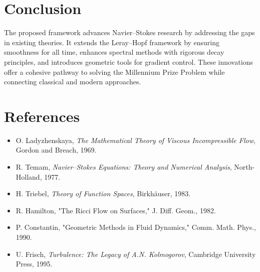 \section{Conclusion}

The proposed framework advances Navier--Stokes research by addressing the gaps in existing theories. It extends the Leray--Hopf framework by ensuring smoothness for all time, enhances spectral methods with rigorous decay principles, and introduces geometric tools for gradient control. These innovations offer a cohesive pathway to solving the Millennium Prize Problem while connecting classical and modern approaches.

\section*{References}
\begin{itemize}
    \item O. Ladyzhenskaya, \emph{The Mathematical Theory of Viscous Incompressible Flow}, Gordon and Breach, 1969.
    \item R. Temam, \emph{Navier--Stokes Equations: Theory and Numerical Analysis}, North-Holland, 1977.
    \item H. Triebel, \emph{Theory of Function Spaces}, Birkh\"auser, 1983.
    \item R. Hamilton, "The Ricci Flow on Surfaces," J. Diff. Geom., 1982.
    \item P. Constantin, "Geometric Methods in Fluid Dynamics," Comm. Math. Phys., 1990.
    \item U. Frisch, \emph{Turbulence: The Legacy of A.N. Kolmogorov}, Cambridge University Press, 1995.
\end{itemize}

